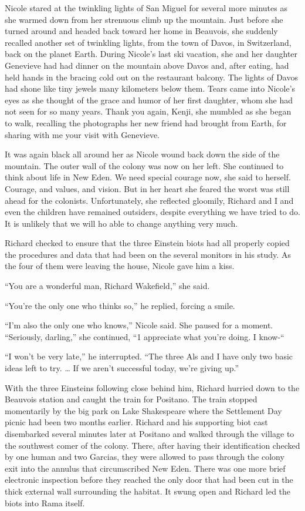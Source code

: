 \documentclass[]{article}
\begin{document}
{Nicole stared at the twinkling lights of San Miguel for several more minutes as she warmed down from her strenuous climb up the mountain. Just before she turned around and headed back toward her home in Beauvois, she suddenly recalled another set of twinkling lights, from the town of Davos, in Switzerland, back on the planet Earth. During Nicole’s last ski vacation, she and her daughter Genevieve had had dinner on the mountain above Davos and, after eating, had held hands in the bracing cold out on the restaurant balcony. The lights of Davos had shone like tiny jewels many kilometers below them. Tears came into Nicole’s eyes as she thought of the grace and humor of her first daughter, whom she had not seen for so many years. Thank you again, Kenji, she mumbled as she began to walk, recalling the photographs her new friend had brought from Earth, for sharing with me your visit with Genevieve.

It was again black all around her as Nicole wound back down the side of the mountain. The outer wall of the colony was now on her left. She continued to think about life in New Eden. We need special courage now, she said to herself. Courage, and values, and vision. But in her heart she feared the worst was still ahead for the colonists. Unfortunately, she reflected gloomily, Richard and I and even the children have remained outsiders, despite everything we have tried to do. It is unlikely that we will ho able to change anything very much.

Richard checked to ensure that the three Einstein biots had all properly copied the procedures and data that had been on the several monitors in his study. As the four of them were leaving the house, Nicole gave him a kiss.

“You are a wonderful man, Richard Wakefield,” she said.

“You’re the only one who thinks so,” he replied, forcing a smile.

“I’m also the only one who knows,” Nicole said. She paused for a moment. “Seriously, darling,” she continued, “1 appreciate what you’re doing. I know-“

“I won’t be very late,” he interrupted. “The three Als and I have only two basic ideas left to try. … If we aren’t successful today, we’re giving up.”

With the three Einsteins following close behind him, Richard hurried down to the Beauvois station and caught the train for Positano. The train stopped momentarily by the big park on Lake Shakespeare where the Settlement Day picnic had been two months earlier. Richard and his supporting biot cast disembarked several minutes later at Positano and walked through the village to the southwest comer of the colony. There, after having their identification checked by one human and two Garcias, they were allowed to pass through the colony exit into the annulus that circumscribed New Eden. There was one more brief electronic inspection before they reached the only door that had been cut in the thick external wall surrounding the habitat. It swung open and Richard led the biots into Rama itself.

}
\end{document}
